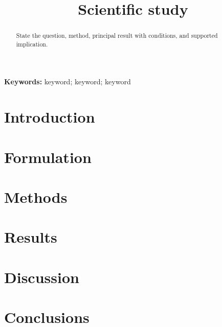 \documentclass[11pt,oneside]{scrartcl}
\title{Scientific study}
\author{}
\date{}
\begin{document}
\maketitle
\begin{abstract}
State the question, method, principal result with conditions, and supported implication.
\end{abstract}
\noindent\textbf{Keywords:} keyword; keyword; keyword

\section{Introduction}
\section{Formulation}
\section{Methods}
\section{Results}
\section{Discussion}
\section{Conclusions}
\printbibliography
\end{document}
